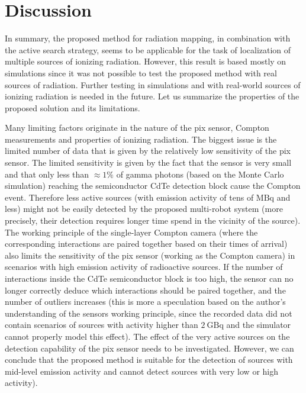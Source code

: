 \section{Discussion}
In summary, the proposed method for radiation mapping, in combination with the active search strategy, seems to be applicable for the task of localization of multiple sources of ionizing radiation.
However, this result is based mostly on simulations since it was not possible to test the proposed method with real sources of radiation.
Further testing in simulations and with real-world sources of ionizing radiation is needed in the future.
Let us summarize the properties of the proposed solution and its limitations.

Many limiting factors originate in the nature of the \ac{pix} sensor, Compton measurements and properties of ionizing radiation.
The biggest issue is the limited number of data that is given by the relatively low sensitivity of the \ac{pix} sensor.
The limited sensitivity is given by the fact that the sensor is very small and that only less than $\approx 1\%$ of gamma photons (based on the Monte Carlo simulation) reaching the semiconductor \ac{CdTe} detection block cause the Compton event.
Therefore less active sources (with emission activity of tens of $\si{\mega\becquerel}$ and less) might not be easily detected by the proposed multi-robot system (more precisely, their detection requires longer time spend in the vicinity of the source).
The working principle of the single-layer Compton camera (where the corresponding interactions are paired together based on their times of arrival) 
also limits the sensitivity of the \ac{pix} sensor (working as the Compton camera) in scenarios with high emission activity of radioactive sources.
If the number of interactions inside the \ac{CdTe} semiconductor block is too high, the sensor can no longer correctly deduce which interactions should be paired together, and the number of outliers increases (this is more a speculation based on the author's understanding of the sensors working principle, since the recorded data did not contain scenarios of sources with activity higher than $\SI{2}{\giga\becquerel}$ and the simulator cannot properly model this effect).
The effect of the very active sources on the detection capability of the \ac{pix} sensor needs to be investigated.
However, we can conclude that the proposed method is suitable for the detection of sources with mid-level emission activity and cannot detect sources with very low or high activity).

